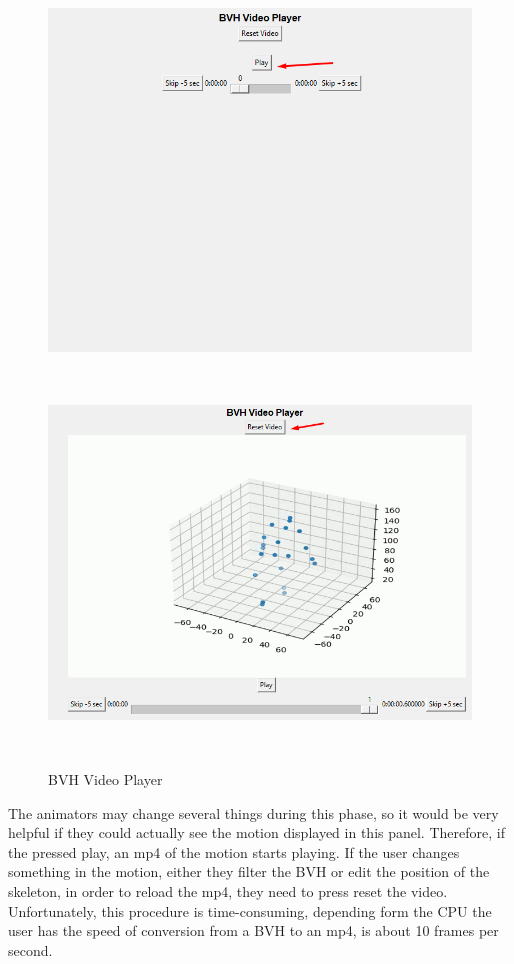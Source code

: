 \begin{figure}[htp]
	\centering
	{\includegraphics[height=10cm,width=0.48\linewidth]{figures/Requirements/Workflow2_3.png}}
	\hspace{1em}%
	{\includegraphics[height=10cm, width=0.48\linewidth]{figures/Requirements/Workflow2_4.png}}
	\captionsetup{labelformat=empty}
	\caption{BVH Video Player}
\end{figure}

The animators may change several things during this phase, so it would be very helpful if they could actually see the motion displayed in this panel. Therefore, if the pressed play, an mp4 of the motion starts playing. If the user changes something in the motion, either they filter the BVH or edit the position of the skeleton, in order to reload the mp4, they need to press reset the video. Unfortunately, this procedure is time-consuming, depending form the CPU the user has the speed of conversion from a BVH to an mp4, is about 10 frames per second.

